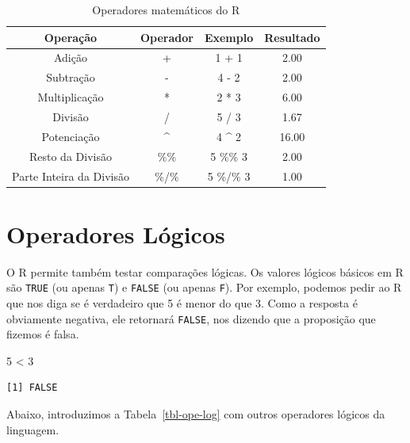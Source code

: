 \documentclass[
  letterpaper,
  DIV=11,
  numbers=noendperiod]{scrreprt}
\newenvironment{Shaded}{\begin{snugshade}}{\end{snugshade}}
\newcommand{\DecValTok}[1]{\textcolor[rgb]{0.68,0.00,0.00}{#1}}
\newcommand{\SpecialCharTok}[1]{\textcolor[rgb]{0.37,0.37,0.37}{#1}}
\begin{document}
\begin{longtable}[]{@{}cccc@{}}

\caption{\label{tbl-ope-mat}Operadores matemáticos do R}

\tabularnewline

\toprule\noalign{}
Operação & Operador & Exemplo & Resultado \\
\midrule\noalign{}
\endhead
\bottomrule\noalign{}
\endlastfoot
Adição & + & 1 + 1 & 2.00 \\
Subtração & - & 4 - 2 & 2.00 \\
Multiplicação & * & 2 * 3 & 6.00 \\
Divisão & / & 5 / 3 & 1.67 \\
Potenciação & \^{} & 4 \^{} 2 & 16.00 \\
Resto da Divisão & \%\% & 5 \%\% 3 & 2.00 \\
Parte Inteira da Divisão & \%/\% & 5 \%/\% 3 & 1.00 \\

\end{longtable}

\section{Operadores Lógicos}\label{operadores-luxf3gicos}

O R permite também testar comparações lógicas. Os valores lógicos
básicos em R são \texttt{TRUE} (ou apenas \texttt{T}) e \texttt{FALSE}
(ou apenas \texttt{F}). Por exemplo, podemos pedir ao R que nos diga se
é verdadeiro que 5 é menor do que 3. Como a resposta é obviamente
negativa, ele retornará \texttt{FALSE}, nos dizendo que a proposição que
fizemos é falsa.

\begin{Shaded}
\begin{Highlighting}[]
\DecValTok{5} \SpecialCharTok{\textless{}} \DecValTok{3}
\end{Highlighting}
\end{Shaded}

\begin{verbatim}
[1] FALSE
\end{verbatim}

Abaixo, introduzimos a Tabela~\ref{tbl-ope-log} com outros operadores
lógicos da linguagem.
\end{document}
